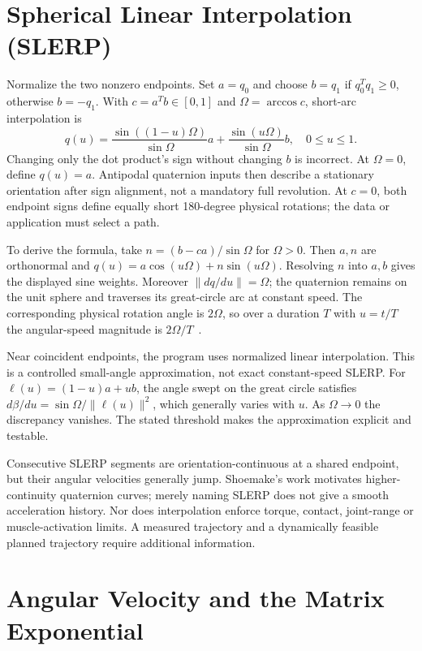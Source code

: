 \section{Spherical Linear Interpolation (SLERP)}
\label{sec:slerp}
\label{def:slerp_def}

Normalize the two nonzero endpoints. Set $a=q_0$ and choose $b=q_1$ if $q_0^Tq_1\ge0$, otherwise $b=-q_1$. With $c=a^Tb\in[0,1]$ and $\Omega=\arccos c$, short-arc interpolation is
\begin{equation}
 q(u)=\frac{\sin((1-u)\Omega)}{\sin\Omega}a+
      \frac{\sin(u\Omega)}{\sin\Omega}b,\quad 0\le u\le 1.
 \label{eq:slerp}
\end{equation}
Changing only the dot product's sign without changing $b$ is incorrect. At $\Omega=0$, define $q(u)=a$. Antipodal quaternion inputs then describe a stationary orientation after sign alignment, not a mandatory full revolution. At $c=0$, both endpoint signs define equally short 180-degree physical rotations; the data or application must select a path.

To derive the formula, take $n=(b-ca)/\sin\Omega$ for $\Omega>0$. Then $a,n$ are orthonormal and $q(u)=a\cos(u\Omega)+n\sin(u\Omega)$. Resolving $n$ into $a,b$ gives the displayed sine weights. Moreover $\|dq/du\|=\Omega$; the quaternion remains on the unit sphere and traverses its great-circle arc at constant speed. The corresponding physical rotation angle is $2\Omega$, so over a duration $T$ with $u=t/T$ the angular-speed magnitude is $2\Omega/T$~\cite{Shoemake1985RotationReview}.

Near coincident endpoints, the program uses normalized linear interpolation. This is a controlled small-angle approximation, not exact constant-speed SLERP. For $\ell(u)=(1-u)a+ub$, the angle swept on the great circle satisfies $d\beta/du=\sin\Omega/\|\ell(u)\|^2$, which generally varies with $u$. As $\Omega\to0$ the discrepancy vanishes. The stated threshold makes the approximation explicit and testable.

Consecutive SLERP segments are orientation-continuous at a shared endpoint, but their angular velocities generally jump. Shoemake's work motivates higher-continuity quaternion curves; merely naming SLERP does not give a smooth acceleration history. Nor does interpolation enforce torque, contact, joint-range or muscle-activation limits. A measured trajectory and a dynamically feasible planned trajectory require additional information.

\section{Angular Velocity and the Matrix Exponential}
\label{sec:angular_velocity}

